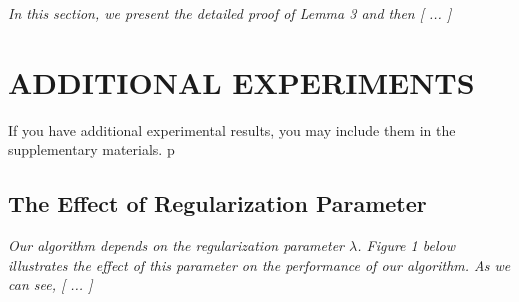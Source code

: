 \documentclass[twoside]{article}
\begin{document}
\textit{In this section, we present the detailed proof of Lemma 3 and then [ ... ]}

\section{ADDITIONAL EXPERIMENTS}

If you have additional experimental results, you may include them in the supplementary materials.
p
\subsection{The Effect of Regularization Parameter}

\textit{Our algorithm depends on the regularization parameter $\lambda$. Figure 1 below illustrates the effect of this parameter on the performance of our algorithm. As we can see, [ ... ]}

\vfill
\end{document}
